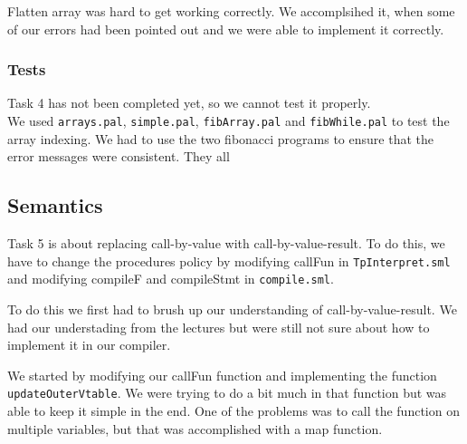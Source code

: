 \documentclass[11pt]{article}
\begin{document}
Flatten array was hard to get working correctly. We accomplsihed it, when some of our errors had been pointed out and we were able to implement it correctly.

\subsubsection*{Tests}%
Task 4 has not been completed yet, so we cannot test it properly.
\\

We used {\tt arrays.pal}, {\tt simple.pal}, {\tt fibArray.pal} and {\tt fibWhile.pal} to test the array indexing. We had to use the two fibonacci programs to ensure that the error messages were consistent. They all 

\subsection*{Semantics}
Task 5 is about replacing call-by-value with call-by-value-result. To do this, we have to change the procedures policy by modifying callFun in {\tt TpInterpret.sml} and modifying compileF and compileStmt in {\tt compile.sml}.

To do this we first had to brush up our understanding of call-by-value-result. We had our understading from the lectures but were still not sure about how to implement it in our compiler.

We started by modifying our callFun function and implementing the function {\tt updateOuterVtable}. We were trying to do a bit much in that function but was able to keep it simple in the end. One of the problems was to call the function on multiple variables, but that was accomplished with a map function.
\end{document}
